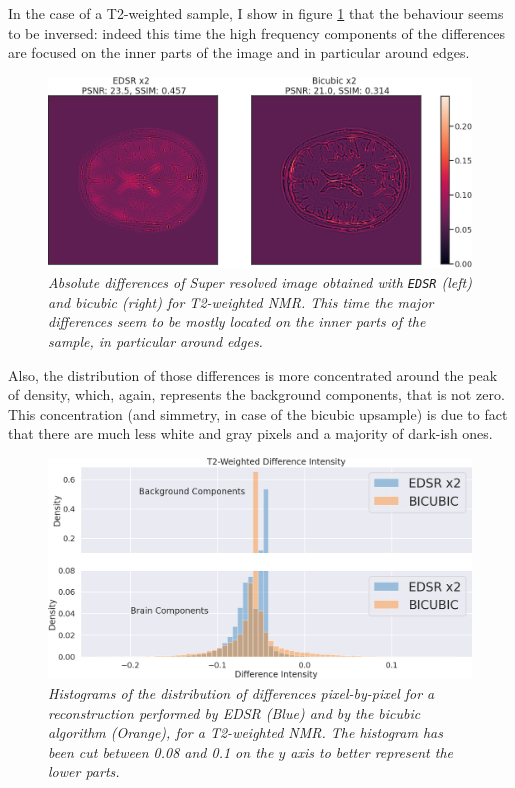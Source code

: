 \documentclass[12pt,a4paper]{report}
\begin{document}
In the case of a T2-weighted sample, I show in figure \ref{fig:edsr-diff-t2-b} that the behaviour seems to be inversed: indeed this time the high frequency components of the differences are focused on the inner parts of the image and in particular around edges.

\begin{figure}[H]
 \centering
 \includegraphics[scale=0.4]{./images/EDSR_diff_t2.png}
 \caption{\it Absolute differences of Super resolved image obtained with {\tt EDSR} (left) and bicubic (right) for T2-weighted NMR. This time the major differences seem to be mostly located on the inner parts of the sample, in particular around edges.}
 \label{fig:edsr-diff-t2-b}
\end{figure}

Also, the distribution of those differences is more concentrated around the peak of density, which, again, represents the background components, that is not zero. 
This concentration (and simmetry, in case of the bicubic upsample) is due to fact that there are much less white and gray pixels and a majority of dark-ish ones.

\begin{figure}[H]
 \centering
 \includegraphics[scale=0.3]{./images/EDSR_diff_histo_t2.png}
 \caption{\it Histograms of the distribution of differences pixel-by-pixel for a reconstruction performed by EDSR (Blue) and by the bicubic algorithm (Orange), for a T2-weighted NMR. The histogram has been cut between 0.08 and 0.1 on the $y$ axis to better represent the lower parts.}
 \label{fig;edsr-diff-histo-t2}
\end{figure}
\end{document}
